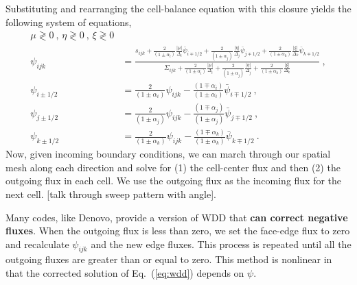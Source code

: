 \documentclass[12pt]{article}
\newcommand{\Di}{\ensuremath{\Delta_i}}
\newcommand{\Dj}{\ensuremath{\Delta_j}}
\newcommand{\Dk}{\ensuremath{\Delta_k}}
\begin{document}
Substituting and rearranging the cell-balance
equation with this closure yields the following system of equations,
\begin{equation}
  \begin{aligned} \mu\gtrless0\:,\,\eta\gtrless0\:,\,\xi\gtrless0\\
    \psi_{ijk} &= \frac{s_{ijk} +
      \frac{2}{(1\pm\alpha_i)}\frac{|\mu|}{\Di}\bar{\psi}_{i\mp1/2} +
      \frac{2}{(1\pm\alpha_j)}\frac{|\eta|}{\Dj}\bar{\psi}_{j\mp1/2} +
      \frac{2}{(1\pm\alpha_k)}\frac{|\xi|}{\Dk}\bar{\psi}_{k\mp1/2}}{
      \Sigma_{ijk} + \frac{2}{(1\pm\alpha_i)}\frac{|\mu|}{\Di} +
      \frac{2}{(1\pm\alpha_j)}\frac{|\eta|}{\Dj} +
      \frac{2}{(1\pm\alpha_k)}\frac{|\xi|}{\Dk} }\:,\\
    \psi_{i\pm1/2} &= \frac{2}{(1\pm\alpha_i)}\psi_{ijk}-
    \frac{(1\mp\alpha_i)}{(1\pm\alpha_i)}\bar{\psi}_{i\mp1/2}\:,\\
    \psi_{j\pm1/2} &= \frac{2}{(1\pm\alpha_j)}\psi_{ijk}-
    \frac{(1\mp\alpha_j)}{(1\pm\alpha_j)}\bar{\psi}_{j\mp1/2}\:,\\
    \psi_{k\pm1/2} &= \frac{2}{(1\pm\alpha_k)}\psi_{ijk}-
    \frac{(1\mp\alpha_k)}{(1\pm\alpha_k)}\bar{\psi}_{k\mp1/2}\:.
  \end{aligned}
  \label{eq:wdd}
\end{equation}
Now, given incoming boundary conditions, we can march through our spatial mesh along each direction and solve for (1) the cell-center flux and then (2) the outgoing flux in each cell. We use the outgoing flux as the incoming flux for the next cell. [talk through sweep pattern with angle].

Many codes, like Denovo, provide a version of WDD that \textbf{can correct negative fluxes}.  When the outgoing flux is less than zero, we set the face-edge flux to zero and
recalculate $\psi_{ijk}$ and the new edge fluxes.  This process is repeated
until all the outgoing fluxes are greater than or equal to zero.  This method
is nonlinear in that the corrected solution of Eq.~(\ref{eq:wdd}) depends on
$\psi$.
\end{document}
